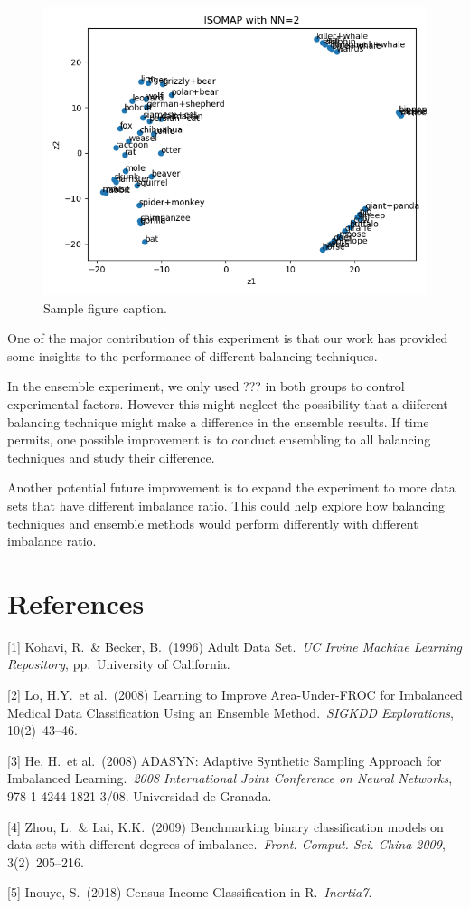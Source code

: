 \documentclass{article}
\begin{document}
\begin{figure}
  \centering
  \includegraphics[width=\linewidth]{pic.png}
  \caption{Sample figure caption.}
\end{figure}

One of the major contribution of this experiment is that our work has provided some insights to the performance of different balancing techniques.

In the ensemble experiment, we only used ??? in both groups to control experimental factors. However this might neglect the possibility that a diiferent balancing technique might make a difference in the ensemble results. If time permits, one possible improvement is to conduct ensembling to all balancing techniques and study their difference.

Another potential future improvement is to expand the experiment to more data sets that have different imbalance ratio. This could help explore how balancing techniques and ensemble methods would perform differently with different imbalance ratio.

\section*{References}

\medskip

\small

[1] Kohavi, R.\ \& Becker, B.\ (1996) Adult Data Set.\ {\it UC Irvine Machine Learning Repository},
pp.\ University of California.

[2] Lo, H.Y.\ et al.\ (2008) Learning to Improve Area-Under-FROC for Imbalanced Medical Data Classification Using an Ensemble Method.\ {\it SIGKDD Explorations},
10(2)\ 43--46.

[3] He, H.\ et al.\ (2008) ADASYN: Adaptive Synthetic Sampling Approach for Imbalanced
Learning.\ {\it 2008 International Joint Conference on Neural Networks}, 978-1-4244-1821-3/08. Universidad de Granada.

[4] Zhou, L.\ \& Lai, K.K.\ (2009) Benchmarking binary classification models on data sets with different degrees of imbalance.\ {\it Front. Comput. Sci. China 2009},
3(2)\ 205--216.

[5] Inouye, S.\ (2018) Census Income Classification in R.\ {\it Inertia7}.
\end{document}
